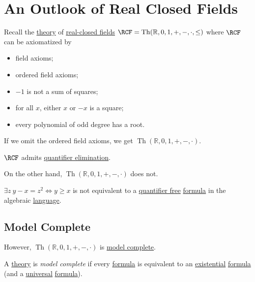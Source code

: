 \section{An Outlook of Real Closed Fields}
Recall the \hyperref[def:theory]{theory} of \hyperref[prev:real-closed-field]{real-closed fields} \(\RCF = \mathop{\mathrm{Th}}(\mathbb{R} , 0, 1, +, -, \cdot, \leq )\) where \(\RCF\) can be axiomatized by
\begin{itemize}
	\item field axioms;
	\item ordered field axioms;
	\item \(-1\) is not a sum of squares;
	\item for all \(x\), either \(x\) or \(-x\) is a square;
	\item every polynomial of odd degree has a root.
\end{itemize}

\begin{remark}
	If we omit the ordered field axioms, we get \(\mathop{\mathrm{Th}}(\mathbb{R} , 0, 1, +, -, \cdot) \).
\end{remark}

\begin{theorem}\label{thm:RCF-QE}
	\(\RCF\) admits \hyperref[def:quantifier-elimination]{quantifier elimination}.
\end{theorem}

On the other hand, \(\mathop{\mathrm{Th}}(\mathbb{R} , 0, 1, +, -, \cdot) \) does not.

\begin{eg}
	\(\exists z\ y - x = z^2 \iff y \geq x\) is not equivalent to a \hyperref[not:quantifier-free]{quantifier free} \hyperref[def:formula]{formula} in the algebraic \hyperref[def:language]{language}.
\end{eg}

\subsection{Model Complete}
However, \(\mathop{\mathrm{Th}}(\mathbb{R} , 0, 1, +, -, \cdot) \) is \hyperref[def:model-complete]{model complete}.

\begin{definition}\label{def:model-complete}
	A \hyperref[def:theory]{theory} is \emph{model complete} if every \hyperref[def:formula]{formula} is equivalent to an \hyperref[not:existential]{existential} \hyperref[def:formula]{formula} (and a \hyperref[not:universal]{universal} \hyperref[def:formula]{formula}).
\end{definition}

